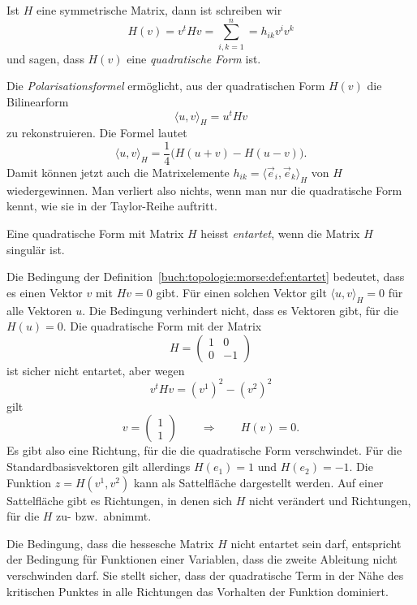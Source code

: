 \begin{definition}
Ist $H$ eine symmetrische Matrix, dann ist schreiben wir
\[
H(v)
=
v^tHv
=
\sum_{i,k=1}^n = h_{ik} v^iv^k
\]
und sagen, dass $H(v)$ eine \emph{quadratische Form} ist.
\end{definition}

Die \emph{Polarisationsformel} \cite[p.~347]{buch:linalg} ermöglicht,
aus der quadratischen Form
$H(v)$ die Bilinearform
\[
\langle u,v\rangle_H
=
u^tHv
\]
zu rekonstruieren.
Die Formel lautet
\[
\langle u,v\rangle_H
=
\frac14\bigl(H(u+v) - H(u-v)\bigr).
\]
Damit können jetzt auch die Matrixelemente
$h_{ik} = \langle\vec{e}_i,\vec{e}_k\rangle_H$ von $H$
wiedergewinnen.
Man verliert also nichts, wenn man nur die quadratische Form kennt,
wie sie in der Taylor-Reihe auftritt.

\begin{definition}
\label{buch:topologie:morse:def:entartet}
Eine quadratische Form mit Matrix $H$ heisst \emph{entartet}, wenn
die Matrix $H$ singulär ist.
\end{definition}

Die Bedingung der Definition~\ref{buch:topologie:morse:def:entartet}
bedeutet, dass es einen Vektor $v$ mit $Hv=0$ gibt.
Für einen solchen Vektor gilt $\langle u,v\rangle_H=0$
für alle Vektoren $u$.
Die Bedingung verhindert nicht, dass es Vektoren gibt, für die
$H(u)=0$.
Die quadratische Form mit der Matrix
\[
H=
\begin{pmatrix}
1&0\\0&-1
\end{pmatrix}
\]
ist sicher nicht entartet, aber wegen
\[
v^tHv
=
(v^1)^2-(v^2)^2
\]
gilt
\[
v=\begin{pmatrix}1\\1\end{pmatrix}
\qquad\Rightarrow\qquad
H(v) = 0.
\]
Es gibt also eine Richtung, für die die quadratische Form verschwindet.
Für die Standardbasisvektoren gilt allerdings
$ H(e_1)=1$ und $H(e_2)=-1$.
Die Funktion $z=H(v^1,v^2)$ kann als Sattelfläche dargestellt werden.
Auf einer Sattelfläche gibt es Richtungen, in denen sich $H$ nicht
verändert und Richtungen, für die $H$ zu- bzw.~abnimmt.

Die Bedingung, dass die hessesche Matrix $H$ nicht entartet sein darf,
entspricht der Bedingung für Funktionen einer Variablen, dass die zweite
Ableitung nicht verschwinden darf.
Sie stellt sicher, dass der quadratische Term in der Nähe des kritischen
Punktes in alle Richtungen das Vorhalten der Funktion dominiert.

